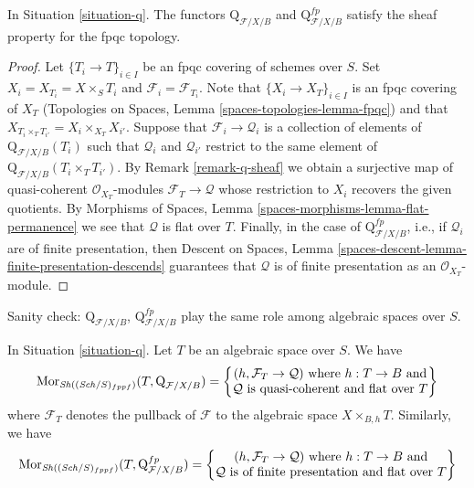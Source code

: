 \begin{lemma}
\label{lemma-q-sheaf}
In Situation \ref{situation-q}. The functors
$\text{Q}_{\mathcal{F}/X/B}$ and
$\text{Q}^{fp}_{\mathcal{F}/X/B}$
satisfy the sheaf property for the fpqc topology.
\end{lemma}

\begin{proof}
Let $\{T_i \to T\}_{i \in I}$ be an fpqc covering of schemes over $S$.
Set $X_i = X_{T_i} = X \times_S T_i$ and $\mathcal{F}_i = \mathcal{F}_{T_i}$.
Note that $\{X_i \to X_T\}_{i \in I}$ is an fpqc covering of
$X_T$ (Topologies on Spaces, Lemma \ref{spaces-topologies-lemma-fpqc})
and that $X_{T_i \times_T T_{i'}} = X_i \times_{X_T} X_{i'}$.
Suppose that $\mathcal{F}_i \to \mathcal{Q}_i$ is a collection of
elements of $\text{Q}_{\mathcal{F}/X/B}(T_i)$ such that $\mathcal{Q}_i$
and $\mathcal{Q}_{i'}$ restrict to the same element of
$\text{Q}_{\mathcal{F}/X/B}(T_i \times_T T_{i'})$. By
Remark \ref{remark-q-sheaf}
we obtain a surjective map of quasi-coherent $\mathcal{O}_{X_T}$-modules
$\mathcal{F}_T \to \mathcal{Q}$ whose restriction to $X_i$ recovers
the given quotients.
By Morphisms of Spaces, Lemma \ref{spaces-morphisms-lemma-flat-permanence}
we see that $\mathcal{Q}$ is flat over $T$. Finally, in the case of
$\text{Q}^{fp}_{\mathcal{F}/X/B}$, i.e., if $\mathcal{Q}_i$ are
of finite presentation, then
Descent on Spaces, Lemma
\ref{spaces-descent-lemma-finite-presentation-descends}
guarantees that $\mathcal{Q}$ is of finite presentation as an
$\mathcal{O}_{X_T}$-module.
\end{proof}

\noindent
Sanity check: $\text{Q}_{\mathcal{F}/X/B}$,
$\text{Q}^{fp}_{\mathcal{F}/X/B}$
play the same role among algebraic spaces
over $S$.

\begin{lemma}
\label{lemma-extend-q-to-spaces}
In Situation \ref{situation-q}. Let $T$ be an algebraic space over $S$.
We have
$$
\mathop{\mathrm{Mor}}\nolimits_{\mathop{\mathit{Sh}}\nolimits((\mathit{Sch}/S)_{fppf})}(T,  \text{Q}_{\mathcal{F}/X/B}) =
\left\{
\begin{matrix}
(h, \mathcal{F}_T \to \mathcal{Q}) \text{ where }
h : T \to B \text{ and}\\
\mathcal{Q}\text{ is quasi-coherent and flat over }T
\end{matrix}
\right\}
$$
where $\mathcal{F}_T$ denotes the pullback of $\mathcal{F}$
to the algebraic space $X \times_{B, h} T$. Similarly, we have
$$
\mathop{\mathrm{Mor}}\nolimits_{\mathop{\mathit{Sh}}\nolimits((\mathit{Sch}/S)_{fppf})}(T,  \text{Q}^{fp}_{\mathcal{F}/X/B}) =
\left\{
\begin{matrix}
(h, \mathcal{F}_T \to \mathcal{Q}) \text{ where }
h : T \to B \text{ and}\\
\mathcal{Q}\text{ is of finite presentation and flat over }T
\end{matrix}
\right\}
$$
\end{lemma}

